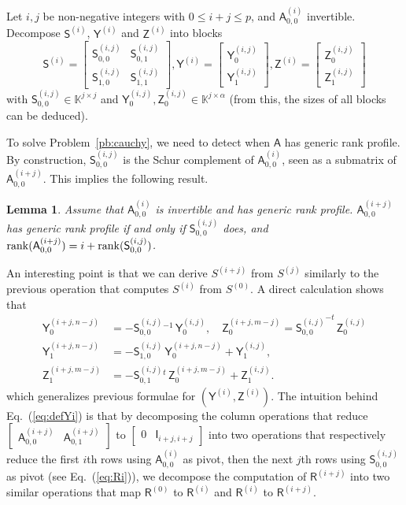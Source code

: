 \documentclass{sig-alternate}
\newcommand{\mA}{\ensuremath{\mathsf{A}}}
\newcommand{\mI}{\ensuremath{\mathsf{I}}}
\newcommand{\mR}{\ensuremath{\mathsf{R}}}
\newcommand{\mS}{\ensuremath{\mathsf{S}}}
\newcommand{\mY}{\ensuremath{\mathsf{Y}}}
\newcommand{\mZ}{\ensuremath{\mathsf{Z}}}
\newcommand{\K}{\ensuremath{\mathbb{K}}}
\newtheorem{lemma}[definition]{Lemma}
\begin{document}
Let $i,j$ be non-negative integers with $0 \le i+j \le p$, and
${\mA^{(i)}_{0,0}}$ invertible. Decompose $\mS^{(i)}$, $\mY^{(i)}$ and
$\mZ^{(i)}$ into blocks
\begin{equation*}
\mS^{(i)} = \begin{bmatrix} 
\mS^{(i,j)}_{0,0} & \mS^{(i,j)}_{0,1} \\
\mS^{(i,j)}_{1,0} & \mS^{(i,j)}_{1,1}
\end{bmatrix},  
\mY^{(i)} = 
\begin{bmatrix}
  \mY^{(i,j)}_0 \\\mY^{(i,j)}_1
\end{bmatrix},
\mZ^{(i)} = 
\begin{bmatrix}
  \mZ^{(i,j)}_0 \\\mZ^{(i,j)}_1
\end{bmatrix}
\end{equation*}
with $\mS^{(i,j)}_{0,0} \in \K^{j \times j}$ and
$\mY^{(i,j)}_0, \mZ^{(i,j)}_0 \in \K^{j \times \alpha}$ (from this,
the sizes of all blocks can be deduced).

To solve Problem~\ref{pb:cauchy}, we need to detect when $\mA$ has
generic rank profile. By construction, $\mS^{(i,j)}_{0,0}$ is the
Schur complement of ${\mA^{(i)}_{0,0}}$, seen as a submatrix of
$\mA^{(i+j)}_{0,0}$. This implies the following result.
%
\begin{lemma}\label{lemma:update}
  Assume that $\mA^{(i)}_{0,0}$ is invertible and has generic rank
  profile.
  $\mA^{(i+j)}_{0,0}$ has generic rank profile if and only if
  $\mS^{(i,j)}_{0,0}$ does, and
  ${\rm rank}(\mA^{(i+j)}_{0,0})=i+{\rm rank}(\mS^{(i,j)}_{0,0})$. 
\end{lemma}
%
An interesting point is that we can derive $S^{(i+j)}$ from $S^{(j)}$
similarly to the previous operation that computes $S^{(i)}$ from
$S^{(0)}$. A direct calculation shows that
%
\begin{align}
\mY^{(i+j,n-j)}_0&= -{\mS^{(i,j)}_{0,0}}{}^{-1} \,\mY^{(i,j)}_0,\quad
\mZ^{(i+j,m-j)}_0= {\mS^{(i,j)}_{0,0}}^{-t} \,\mZ^{(i,j)}_0 \nonumber\\
\mY^{(i+j,n-j)}_1&=-\mS^{(i,j)}_{1,0} \,\mY^{(i+j,n-j)}_0 + \mY^{(i,j)}_1,\label{eq:defYi}\\
\mZ^{(i+j,m-j)}_1&=-{\mS^{(i,j)}_{0,1}}{}^t \,\mZ^{(i+j,m-j)}_0 + \mZ^{(i,j)}_1 \nonumber.
\end{align}
%
which generalizes previous formulae for $(\mY^{(i)},\mZ^{(i)})$.  The
intuition behind Eq.~(\ref{eq:defYi}) is that by decomposing the
column operations that reduce
$\begin{bmatrix} \mA^{(i+j)}_{0,0} & \mA^{(i+j)}_{0,1} \end{bmatrix}$
to $\begin{bmatrix} 0 & \mI_{i+j,i+j} \end{bmatrix}$ into two
operations that respectively reduce the first $i$th rows using
$\mA^{(i)}_{0,0}$ as pivot, then the next $j$th rows using
$\mS^{(i,j)}_{0,0}$ as pivot (see Eq.~(\ref{eq:Ri})), we decompose the
computation of $\mR^{(i+j)}$ into two similar operations that map
$\mR^{(0)}$ to $\mR^{(i)}$ and $\mR^{(i)}$ to $\mR^{(i+j)}$.
\end{document}
